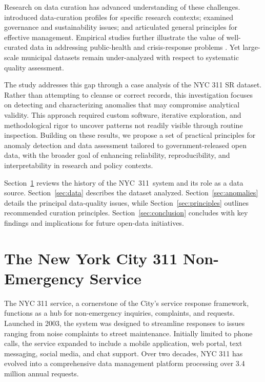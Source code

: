 \documentclass[linenumber]{jdsart}
\begin{document}
Research on data curation has advanced understanding of these challenges.  
\citet{witt2009constructing} introduced data-curation profiles for specific 
research contexts; \citet{borgman2012conundrum} examined governance and 
sustainability issues; and \citet{hart2016ten} articulated general principles 
for effective management.  Empirical studies further illustrate the value of 
well-curated data in addressing public-health and crisis-response problems 
\citep{cantor2018facets,shankar2021data}.  Yet large-scale municipal datasets 
remain under-analyzed with respect to systematic quality assessment.

The study addresses this gap through a case analysis of the 
\textsc{NYC 311 SR} dataset.  Rather than attempting to cleanse or correct 
records, this investigation focuses on detecting and characterizing anomalies 
that may compromise analytical validity. This approach 
required custom software, iterative exploration, and 
methodological rigor to uncover patterns not readily visible through routine 
inspection.  Building on these results, we propose a set of practical 
principles for anomaly detection and data assessment tailored to 
government-released open data, with the broader goal of enhancing reliability, 
reproducibility, and interpretability in research and policy contexts.

Section~\ref{sec:service} reviews the history of the NYC~311~system and its 
role as a data source. Section~\ref{sec:data} describes the dataset analyzed. 
Section~\ref{sec:anomalies} details the principal data-quality issues, 
while Section~\ref{sec:principles} outlines recommended 
curation principles.  Section~\ref{sec:conclusion} concludes with key 
findings and implications for future open-data initiatives.


\section{The New York City 311 Non-Emergency Service} 
\label{sec:service}
The NYC 311 service, a cornerstone of the City’s 
service response framework, functions as a hub for 
non-emergency inquiries, complaints, and requests. Launched in 2003, the system was 
designed to streamline responses to issues ranging from noise complaints 
to street maintenance. Initially limited to phone calls, the service 
expanded to include a mobile application, web portal, text 
messaging, social media, and chat support. Over two decades, 
NYC 311 has evolved into a comprehensive data management platform processing over 3.4 million 
annual requests. 
\end{document}
